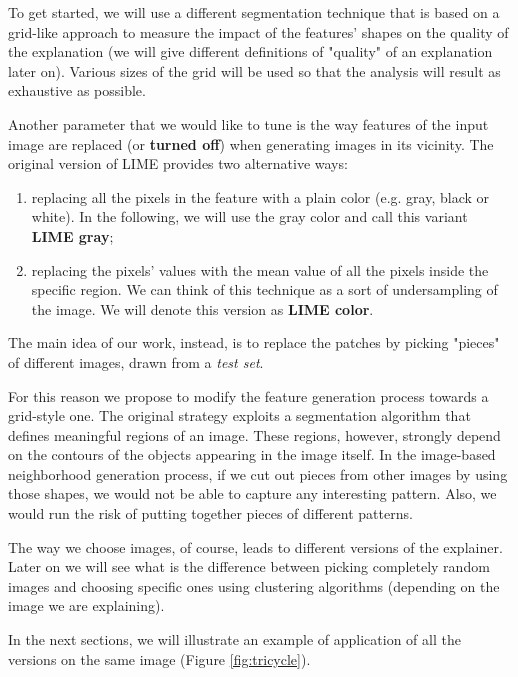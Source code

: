 \documentclass[12pt, twoside, a4paper]{report}
\begin{document}
To get started, we will use a different segmentation technique that is based on a grid-like approach to measure the impact of the features' shapes on the quality of the explanation (we will give different definitions of "quality" of an explanation later on). Various sizes of the grid will be used so that the analysis will result as exhaustive as possible. 

Another parameter that we would like to tune is the way features of the input image are replaced (or \textbf{turned off}) when generating images in its vicinity. The original version of LIME provides two alternative ways:

\begin{enumerate}
\item replacing all the pixels in the feature with a plain color (e.g. gray, black or white). In the following, we will use the gray color and call this variant \textbf{LIME gray};
\item replacing the pixels' values with the mean value of all the pixels inside the specific region. We can think of this technique as a sort of undersampling of the image. We will denote this version as \textbf{LIME color}.
\end{enumerate}

The main idea of our work, instead, is to replace the patches by picking "pieces" of different images, drawn from a \textit{test set}.

For this reason we propose to modify the feature generation process towards a grid-style one. The original strategy exploits a segmentation algorithm that defines meaningful regions of an image. These regions, however, strongly depend on the contours of the objects appearing in the image itself. In the image-based neighborhood generation process, if we cut out pieces from other images by using those shapes, we would not be able to capture any interesting pattern. Also, we would run the risk of putting together pieces of different patterns.

The way we choose images, of course, leads to different versions of the explainer. Later on we will see what is the difference between picking completely random images and choosing specific ones using clustering algorithms (depending on the image we are explaining). 

In the next sections, we will illustrate an example of application of all the versions on the same image (Figure \ref{fig:tricycle}).
\end{document}
